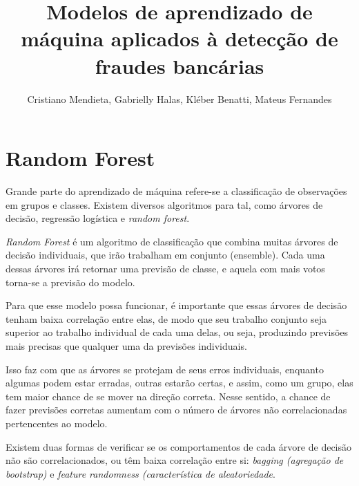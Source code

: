 \documentclass{article}
\title{Modelos de aprendizado de máquina aplicados à detecção de fraudes bancárias}
\author{Cristiano Mendieta, Gabrielly Halas, Kléber Benatti, Mateus Fernandes}
\begin{document}
\section{Random Forest}

Grande parte do aprendizado de máquina refere-se a classificação de observações em grupos e classes. Existem diversos algoritmos para tal, como árvores de decisão, regressão logística e \textit{random forest}.

\textit{Random Forest} é um algoritmo de classificação que combina muitas árvores de decisão individuais, que irão trabalham em conjunto (ensemble). Cada uma dessas árvores irá retornar uma previsão de classe, e aquela com mais votos torna-se a previsão do modelo.

Para que esse modelo possa funcionar, é importante que essas árvores de decisão tenham baixa correlação entre elas, de modo que seu trabalho conjunto seja superior ao trabalho individual de cada uma delas, ou seja, produzindo previsões mais precisas que qualquer uma da previsões individuais. 

Isso faz com que as árvores se protejam de seus erros individuais, enquanto algumas podem estar erradas, outras estarão certas, e assim, como um grupo, elas tem maior chance de se mover na direção correta. Nesse sentido, a chance de fazer previsões corretas aumentam com o número de árvores não correlacionadas pertencentes ao modelo.

Existem duas formas de verificar se os comportamentos de cada árvore de decisão não são correlacionados, ou têm baixa correlação entre si: \textit{bagging (agregação de bootstrap)} e \textit{feature randomness (característica de aleatoriedade}.
\end{document}

